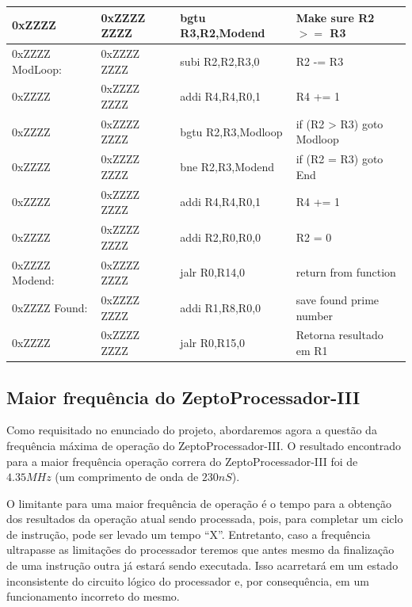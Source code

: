 \documentclass[12pt]{article}
\begin{document}
\begin{table}[H]
\begin{tabular}{|l|l|l|l|}
        0xZZZZ         & 0xZZZZ ZZZZ & bgtu R3,R2,Modend  & Make sure R2 $>=$ R3        \\\hline
        0xZZZZ ModLoop:& 0xZZZZ ZZZZ & subi R2,R2,R3,0    & R2 -= R3                    \\\hline
        0xZZZZ         & 0xZZZZ ZZZZ & addi R4,R4,R0,1    & R4 += 1                     \\\hline
        0xZZZZ         & 0xZZZZ ZZZZ & bgtu R2,R3,Modloop & if (R2 > R3) goto Modloop   \\\hline
        0xZZZZ         & 0xZZZZ ZZZZ & bne  R2,R3,Modend  & if (R2 \!= R3) goto End     \\\hline
        0xZZZZ         & 0xZZZZ ZZZZ & addi R4,R4,R0,1    & R4 += 1                     \\\hline
        0xZZZZ         & 0xZZZZ ZZZZ & addi R2,R0,R0,0    & R2 = 0                      \\\hline
        0xZZZZ Modend: & 0xZZZZ ZZZZ & jalr R0,R14,0      & return from function        \\\hline
        0xZZZZ Found:  & 0xZZZZ ZZZZ & addi R1,R8,R0,0    & save found prime number     \\\hline
        0xZZZZ         & 0xZZZZ ZZZZ & jalr R0,R15,0      & Retorna resultado em R1     \\\hline
    \end{tabular}\label{tab:programs:primo}
\end{table}



\subsection{Maior frequência do ZeptoProcessador-III}\label{sec:programs:frequency}

Como requisitado no enunciado do projeto, abordaremos agora a questão da
frequência máxima de operação do ZeptoProcessador-III. O resultado encontrado
para a maior frequência operação correra do ZeptoProcessador-III foi de
$4.35MHz$ (um comprimento de onda de $230nS$).

O limitante para uma maior frequência de operação é o tempo para a obtenção dos
resultados da operação atual sendo processada, pois, para completar um ciclo de
instrução, pode ser levado um tempo ``X''. Entretanto, caso a frequência
ultrapasse as limitações do processador teremos que antes mesmo da finalização
de uma instrução outra já estará sendo executada. Isso acarretará em um estado
inconsistente do circuito lógico do processador e, por consequência, em um
funcionamento incorreto do mesmo.
\end{document}
